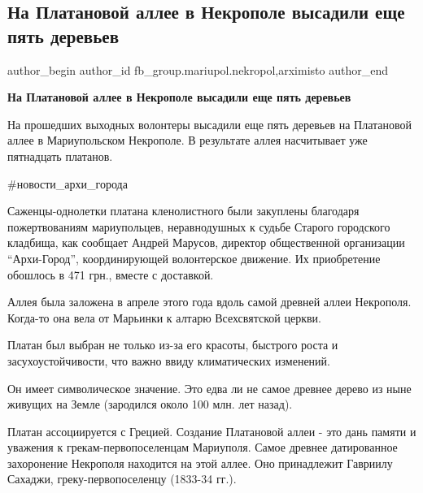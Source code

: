  
 
 
 
 

\subsection{На Платановой аллее в Некрополе высадили еще пять деревьев}
\label{sec:26_08_2021.fb.fb_group.mariupol.nekropol.1.na_platanovoj_allee_5_derevjev}
 
\ifcmt
 author_begin
   author_id fb_group.mariupol.nekropol,arximisto
 author_end
\fi

\vspace{0.5cm}
\textbf{На Платановой аллее в Некрополе высадили еще пять деревьев}

На прошедших выходных волонтеры высадили еще пять деревьев на Платановой аллее
в Мариупольском Некрополе. В результате аллея насчитывает уже пятнадцать
платанов.

\#новости\_архи\_города

Саженцы-однолетки платана кленолистного были закуплены благодаря пожертвованиям
мариупольцев, неравнодушных к судьбе Старого городского кладбища, как сообщает
Андрей Марусов, директор общественной организации \enquote{Архи-Город}, координирующей
волонтерское движение. Их приобретение обошлось в 471 грн., вместе с доставкой.

Аллея была заложена в апреле этого года вдоль самой древней аллеи Некрополя.
Когда-то она вела от Марьинки к алтарю Всехсвятской церкви.

Платан был выбран не только из-за его красоты, быстрого роста и
засухоустойчивости, что важно ввиду климатических изменений.

Он имеет символическое значение. Это едва ли не самое древнее дерево из ныне
живущих на Земле (зародился около 100 млн. лет назад).

Платан ассоциируется с Грецией. Создание Платановой аллеи - это дань памяти и
уважения к грекам-первопоселенцам Мариуполя. Самое древнее датированное
захоронение Некрополя находится на этой аллее. Оно принадлежит Гавриилу
Сахаджи, греку-первопоселенцу (1833-34 гг.).

